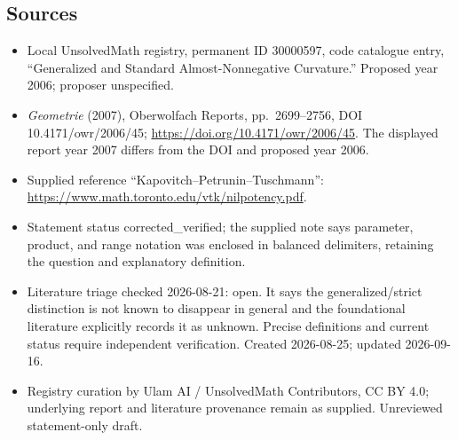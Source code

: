 \documentclass[11pt]{article}
\begin{document}
\subsection{Sources}
\begin{itemize}
\item Local UnsolvedMath registry, permanent ID 30000597, code catalogue entry, ``Generalized and Standard Almost-Nonnegative Curvature.'' Proposed year 2006; proposer unspecified.
\item \emph{Geometrie} (2007), Oberwolfach Reports, pp.\ 2699--2756, DOI 10.4171/owr/2006/45; \url{https://doi.org/10.4171/owr/2006/45}. The displayed report year 2007 differs from the DOI and proposed year 2006.
\item Supplied reference ``Kapovitch--Petrunin--Tuschmann'': \url{https://www.math.toronto.edu/vtk/nilpotency.pdf}.
\item Statement status corrected\_verified; the supplied note says parameter, product, and range notation was enclosed in balanced delimiters, retaining the question and explanatory definition.
\item Literature triage checked 2026-08-21: open. It says the generalized/strict distinction is not known to disappear in general and the foundational literature explicitly records it as unknown. Precise definitions and current status require independent verification. Created 2026-08-25; updated 2026-09-16.
\item Registry curation by Ulam AI / UnsolvedMath Contributors, CC BY 4.0; underlying report and literature provenance remain as supplied. Unreviewed statement-only draft.
\end{itemize}
\end{document}
